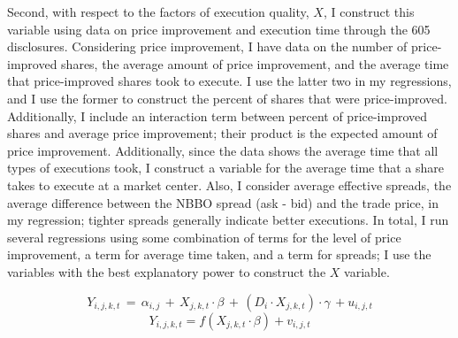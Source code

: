 \documentclass[12pt,a4paper]{extarticle}
\begin{document}
	Second, with respect to the factors of execution quality, $X$, I construct this variable using data on price improvement and execution time through the 605 disclosures. Considering price improvement, I have data on the number of price-improved shares, the average amount of price improvement, and the average time that price-improved shares took to execute. I use the latter two in my regressions, and I use the former to construct the percent of shares that were price-improved. Additionally, I include an interaction term between percent of price-improved shares and average price improvement; their product is the expected amount of price improvement. Additionally, since the data shows the average time that all types of executions took, I construct a variable for the average time that a share takes to execute at a market center. Also, I consider average effective spreads, the average difference between the NBBO spread (ask - bid) and the trade price, in my regression; tighter spreads generally indicate better executions. In total, I run several regressions using some combination of terms for the level of price improvement, a term for average time taken, and a term for spreads; I use the variables with the best explanatory power to construct the $X$ variable. 
	
	\begin{equation}
	Y_{i, j, k,  t} \,=\, \alpha_{i,j} \,+\,  X_{j, k, t} \cdot \beta \,+\,  (D_i \cdot X_{j, k, t}) \cdot \gamma\, +  u_{i, j, t}
	\end{equation}	
	\begin{equation}
	Y_{i, j, k, t} = f(X_{j, k, t} \cdot \beta) +  v_{i, j, t}
	\end{equation}	
\end{document}
